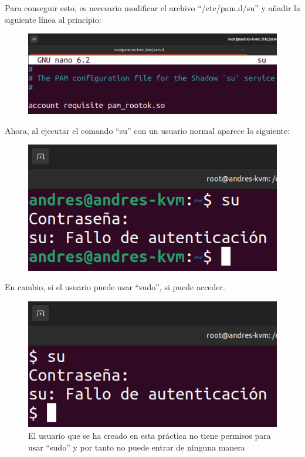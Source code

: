\documentclass{article}
\begin{document}
Para conseguir esto, es necesario modificar el archivo ``/etc/pam.d/su'' y añadir la siguiente línea al principio:

\begin{figure}[H]
    \includegraphics[width=\textwidth]{imagenes/sudeny.png}
\end{figure}

Ahora, al ejecutar el comando ``su'' con un usuario normal aparece lo siguiente:

\begin{figure}[H]
    \includegraphics[width=\textwidth]{imagenes/sudenyuser.png}
\end{figure}


En cambio, si el usuario puede usar ``sudo'', si puede acceder.

\begin{figure}[H]
    \includegraphics[width=\textwidth]{imagenes/sudenyuserprueba.png}
    \caption{El usuario que se ha creado en esta práctica no tiene permisos para usar ``sudo'' y por tanto no puede entrar de ninguna manera}
\end{figure}
\end{document}

